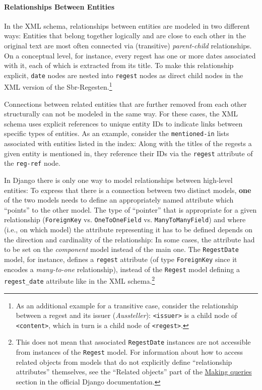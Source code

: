 \paragraph{Relationships Between Entities}

In the XML schema, relationships between entities are modeled in two
different ways: Entities that belong together logically and are close
to each other in the original text are most often connected via
(transitive) \emph{parent-child} relationships. On a conceptual level,
for instance, every regest has one or more dates associated with it,
each of which is extracted from its title. To make this relationship
explicit, \texttt{date} nodes are nested into \texttt{regest} nodes as
direct child nodes in the XML version of the Sbr-Regesten.\footnote{As
  an additional example for a transitive case, consider the
  relationship between a regest and its issuer (\emph{Aussteller}):
  \texttt{<issuer>} is a child node of \texttt{<content>}, which in
  turn is a child node of \texttt{<regest>}.}

Connections between related entities that are further removed from
each other structurally can not be modeled in the same way. For these
cases, the XML schema uses explicit references to unique entity IDs to
indicate links between specific types of entities. As an example,
consider the \texttt{mentioned-in} lists associated with entities
listed in the index: Along with the titles of the regests a given
entity is mentioned in, they reference their IDs via the
\texttt{regest} attribute of the \texttt{reg-ref} node.

In Django there is only one way to model relationships between
high-level entities: To express that there is a connection between two
distinct models, \textbf{one} of the two models needs to define an
appropriately named attribute which ``points'' to the other model. The
type of ``pointer'' that is appropriate for a given relationship
(\texttt{ForeignKey} vs. \texttt{OneToOneField} vs.
\texttt{ManyToManyField}) and where (i.e., on which model) the
attribute representing it has to be defined depends on the direction
and cardinality of the relationship: In some cases, the attribute had
to be set on the \emph{component} model instead of the main one. The
\texttt{RegestDate} model, for instance, defines a \texttt{regest}
attribute (of type \texttt{ForeignKey} since it encodes a
\emph{many-to-one} relationship), instead of the \texttt{Regest} model
defining a \texttt{regest\_date} attribute like in the XML
schema.\footnote{This does not mean that associated
  \texttt{RegestDate} instances are not accessible from instances of
  the \texttt{Regest} model. For information about how to access
  related objects from models that do not explicitly define
  ``relationship attributes'' themselves, see the ``Related objects''
  part of the
  \href{https://docs.djangoproject.com/en/1.4/topics/db/queries/}{Making
    queries} section in the official Django documentation.}

